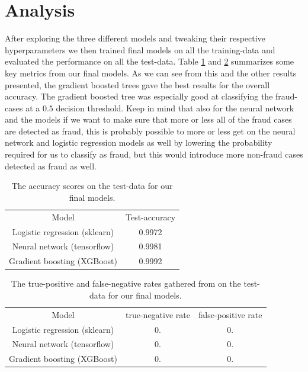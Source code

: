 \documentclass{article}
\begin{document}
\section{Analysis}
After exploring the three different models and tweaking their respective
hyperparameters we then trained final models on all the training-data and
evaluated the performance on all the test-data. Table
\ref{finalmodelscomparison} and \ref{finalmodelscomparisonfnrtpr} summarizes
some key metrics from our final models. As we can see from this and the other
results presented, the gradient boosted trees gave the best results for the
overall accuracy.  The gradient boosted tree was especially good at classifying
the fraud-cases at a $0.5$ decision threshold.  Keep in mind that also for the neural network and  the
models if we want to make sure that more or less all of the fraud cases are
detected as fraud, this is probably possible to more or less get on the neural
network and logistic regression models as well by lowering the probability
required for us to classify as fraud, but this would introduce more non-fraud
cases detected as fraud as well.
\begin{table}
	\centering
	\begin{tabular}{| c | c |}
		Model                         & Test-accuracy \\
		Logistic regression (sklearn) & 0.9972        \\
		Neural network (tensorflow)   & 0.9981        \\
		Gradient boosting (XGBoost)   & 0.9992
	\end{tabular}
	\caption{The accuracy scores on the test-data for our final models.}
	\label{finalmodelscomparison}
\end{table}
\begin{table}
	\centering
	\begin{tabular}{| c | c | c |}
		Model                         & true-negative rate & false-positive rate \\
		Logistic regression (sklearn) & 0.                 & 0.                  \\
		Neural network (tensorflow)   & 0.                 & 0.                  \\
		Gradient boosting (XGBoost)   & 0.                 & 0.
	\end{tabular}
	\caption{The true-positive and false-negative rates gathered from on the test-data for our final models.}
	\label{finalmodelscomparisonfnrtpr}
\end{table}
\end{document}
